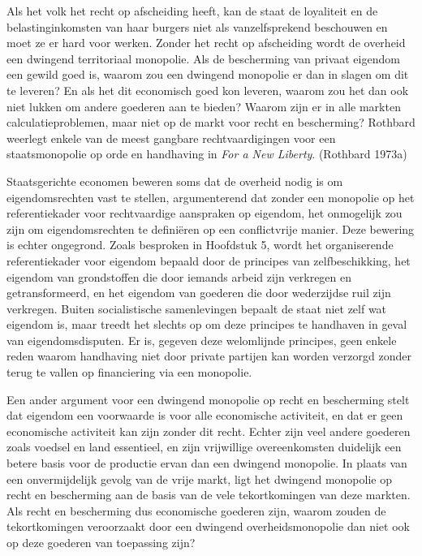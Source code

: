 \documentclass[
  a5paper,
  smalldemyvopaper,11pt,twoside,onecolumn,openright,extrafontsizes,
hidelinks]{memoir}
\begin{document}
Als het volk het recht op afscheiding heeft, kan de staat de loyaliteit
en de belastinginkomsten van haar burgers niet als vanzelfsprekend
beschouwen en moet ze er hard voor werken. Zonder het recht op
afscheiding wordt de overheid een dwingend territoriaal monopolie. Als
de bescherming van privaat eigendom een gewild goed is, waarom zou een
dwingend monopolie er dan in slagen om dit te leveren? En als het dit
economisch goed kon leveren, waarom zou het dan ook niet lukken om
andere goederen aan te bieden? Waarom zijn er in alle markten
calculatieproblemen, maar niet op de markt voor recht en bescherming?
Rothbard weerlegt enkele van de meest gangbare rechtvaardigingen voor
een staatsmonopolie op orde en handhaving in \emph{For a New Liberty}.
(Rothbard 1973a)

Staatsgerichte economen beweren soms dat de overheid nodig is om
eigendomsrechten vast te stellen, argumenterend dat zonder een monopolie
op het referentiekader voor rechtvaardige aanspraken op eigendom, het
onmogelijk zou zijn om eigendomsrechten te definiëren op een
conflictvrije manier. Deze bewering is echter ongegrond. Zoals besproken
in Hoofdstuk 5, wordt het organiserende referentiekader voor eigendom
bepaald door de principes van zelfbeschikking, het eigendom van
grondstoffen die door iemands arbeid zijn verkregen en getransformeerd,
en het eigendom van goederen die door wederzijdse ruil zijn verkregen.
Buiten socialistische samenlevingen bepaalt de staat niet zelf wat
eigendom is, maar treedt het slechts op om deze principes te handhaven
in geval van eigendomsdisputen. Er is, gegeven deze welomlijnde
principes, geen enkele reden waarom handhaving niet door private
partijen kan worden verzorgd zonder terug te vallen op financiering via
een monopolie.

Een ander argument voor een dwingend monopolie op recht en bescherming
stelt dat eigendom een voorwaarde is voor alle economische activiteit,
en dat er geen economische activiteit kan zijn zonder dit recht. Echter
zijn veel andere goederen zoals voedsel en land essentieel, en zijn
vrijwillige overeenkomsten duidelijk een betere basis voor de productie
ervan dan een dwingend monopolie. In plaats van een onvermijdelijk
gevolg van de vrije markt, ligt het dwingend monopolie op recht en
bescherming aan de basis van de vele tekortkomingen van deze markten.
Als recht en bescherming dus economische goederen zijn, waarom zouden de
tekortkomingen veroorzaakt door een dwingend overheidsmonopolie dan niet
ook op deze goederen van toepassing zijn?
\end{document}
